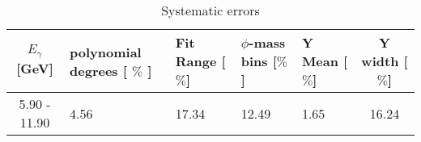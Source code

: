 \documentclass[8pt]{extarticle}
\begin{document}
 \begin{table}[!htbp]
 \begin{minipage}{\textwidth}
 \begin{center}
 \caption{Systematic errors}
 \begin{tabularx}{\textwidth}{|c|X|X|X|X|c|}
 \hline
 $E_{\gamma}$ [GeV] & polynomial degrees [ $\%$ ] & Fit Range [$\%$] & $\phi$-mass bins [$\%$]  & Y Mean [$\%$] & Y width [$\%$] \\ 
 \hline
5.90 - 11.90 & 4.56 & 17.34 & 12.49 & 1.65 & 16.24 \\ 
\hline
 \end{tabularx}
 \end{center}
 \end{minipage}
 \end{table}
 
\end{document}
